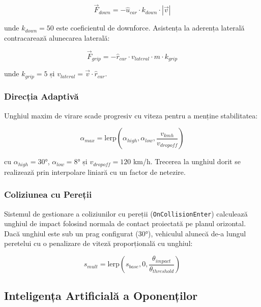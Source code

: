 \begin{equation}
    \vec{F}_{down} = -\hat{u}_{car} \cdot k_{down} \cdot |\vec{v}|
\end{equation}

unde $k_{down} = 50$ este coeficientul de downforce. Asistența la aderența laterală contracarează alunecarea laterală:

\begin{equation}
    \vec{F}_{grip} = -\hat{r}_{car} \cdot v_{lateral} \cdot m \cdot k_{grip}
\end{equation}

unde $k_{grip} = 5$ și $v_{lateral} = \vec{v} \cdot \hat{r}_{car}$.

\subsubsection{Direcția Adaptivă}

Unghiul maxim de virare scade progresiv cu viteza pentru a menține stabilitatea:

\begin{equation}
    \alpha_{max} = \text{lerp}\left(\alpha_{high}, \alpha_{low}, \frac{v_{kmh}}{v_{dropoff}}\right)
\end{equation}

cu $\alpha_{high} = 30°$, $\alpha_{low} = 8°$ și $v_{dropoff} = 120$ km/h. Trecerea la unghiul dorit se realizează prin interpolare liniară cu un factor de netezire.

\subsubsection{Coliziunea cu Pereții}

Sistemul de gestionare a coliziunilor cu pereții (\texttt{OnCollisionEnter}) calculează unghiul de impact folosind normala de contact proiectată pe planul orizontal. Dacă unghiul este sub un prag configurat ($30°$), vehiculul alunecă de-a lungul peretelui cu o penalizare de viteză proporțională cu unghiul:

\begin{equation}
    s_{mult} = \text{lerp}\left(s_{base}, 0, \frac{\theta_{impact}}{\theta_{threshold}}\right)
\end{equation}

\subsection{Inteligența Artificială a Oponenților}

